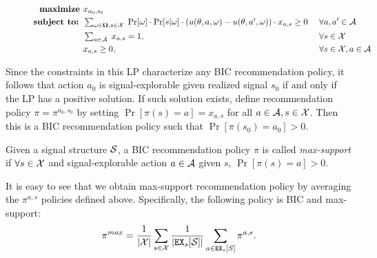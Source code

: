 \begin{figure}[H]
\begin{mdframed}
\vspace{-5mm}
\begin{alignat*}{2}
\textbf{maximize }   & x_{a_0,s_0}\  \\
\textbf{subject to: }
    & \textstyle \sum_{\omega \in \varOmega, s \in \X} \;
    \Pr[\omega] \cdot \Pr[s | \omega] \cdot 
        \left(u(\theta, a, \omega) - u(\theta, a', \omega)\right) \cdot x_{a,s} \geq 0   &\ & \forall a,a' \in \A \\
    & \textstyle \sum_{a\in \A}\; x_{a,s} = 1,  \ &\ & \forall s \in \X \\
    & x_{a,s} \geq 0,  \ &\ & \forall s \in \X, a\in \A
\end{alignat*}
\end{mdframed}
\label{fig:public_lp}
\end{figure}

Since the constraints in this LP characterize any BIC recommendation policy, it follows that action $a_0$ is signal-explorable given realized signal $s_0$ if and only if the LP has a positive solution. If such solution exists, define recommendation policy $\pi = \pi^{a_0,s_0}$ by setting 
    $\Pr[\pi(s) = a] = x_{a,s}$ for all $a\in \A, s\in \X$. 
Then this is a BIC recommendation policy such that 
    $\Pr[\pi(s_0) = a_0] > 0$.

\begin{definition}
Given a signal structure $\S$, a BIC recommendation policy $\pi$ is called  \emph{max-support} if $\forall s \in \X$  and signal-explorable action $a\in \A$ given $s$, $\Pr[\pi(s) = a] > 0$.
\end{definition}


It is easy to see that we obtain max-support recommendation policy by averaging the $\pi^{a,s}$ policies defined above. Specifically, the following policy is BIC and max-support:
\begin{align}\label{eq:pimax}
\pi^{max} = \frac{1}{|\X|} \sum_{s \in \X} \frac{1}{|\EX_s[\S]|} \sum_{a \in \EX_s[S]} \pi^{a,s}.
\end{align}

%

